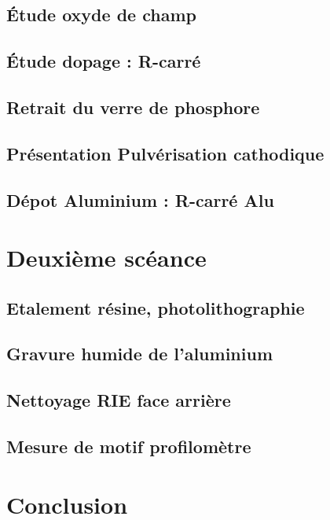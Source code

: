 \documentclass[11pt]{article}
\begin{document}
\subsection{\'Etude oxyde de champ}

\subsection{\'Etude dopage : R-carr\'e}

\subsection{Retrait du verre de phosphore}

\subsection{Pr\'esentation Pulv\'erisation cathodique}

\subsection{D\'epot Aluminium : R-carr\'e Alu }

\section{Deuxi\`eme sc\'eance}

\subsection{Etalement r\'esine, photolithographie}

\subsection{Gravure humide de l'aluminium}

\subsection{Nettoyage RIE face arri\`ere}

\subsection{Mesure de motif profilom\`etre}


\section{Conclusion}
\end{document}
